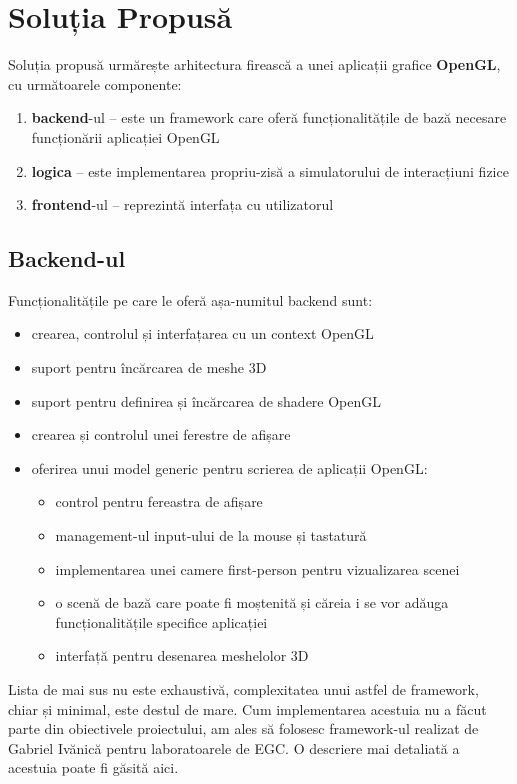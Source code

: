 \documentclass[12pt,a4paper]{report}
\begin{document}
\chapter{Soluția Propusă}

Soluția propusă urmărește arhitectura firească a unei aplicații grafice \textbf{OpenGL}, cu următoarele componente:

\begin{enumerate}
	\item \textbf{backend}-ul -- este un framework care oferă funcționalitățile de bază necesare funcționării aplicației OpenGL
	\item \textbf{logica} -- este implementarea propriu-zisă a simulatorului de interacțiuni fizice
	\item \textbf{frontend}-ul -- reprezintă interfața cu utilizatorul
\end{enumerate}

\section{Backend-ul}

Funcționalitățile pe care le oferă așa-numitul backend sunt:
\begin{itemize}
	\item crearea, controlul și interfațarea cu un context OpenGL
	\item suport pentru încărcarea de meshe 3D
	\item suport pentru definirea și încărcarea de shadere OpenGL
	\item crearea și controlul unei ferestre de afișare
	\item oferirea unui model generic pentru scrierea de aplicații OpenGL:
		\begin{itemize}
			\item control pentru fereastra de afișare
			\item management-ul input-ului de la mouse și tastatură
			\item implementarea unei camere first-person pentru vizualizarea scenei
			\item o scenă de bază care poate fi moștenită și căreia i se vor adăuga funcționalitățile specifice aplicației
			\item interfață pentru desenarea meshelolor 3D
		\end{itemize}
\end{itemize}
Lista de mai sus nu este exhaustivă, complexitatea unui astfel de framework, chiar și minimal, este destul de mare. Cum implementarea acestuia nu a făcut parte din obiectivele proiectului, am ales să folosesc framework-ul realizat de Gabriel Ivănică pentru laboratoarele de EGC\cite{framework_egc_github}. O descriere mai detaliată a acestuia poate fi găsită aici\cite{framework_egc_ocw}.
\end{document}
